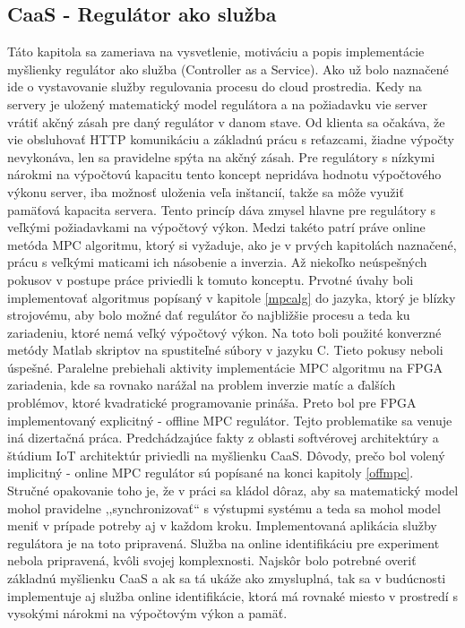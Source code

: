 \subsection{CaaS - Regulátor ako služba} \label{caas}
Táto kapitola sa zameriava na vysvetlenie, motiváciu a popis implementácie myšlienky regulátor ako služba (Controller as a Service). Ako už bolo naznačené ide o vystavovanie služby regulovania procesu do cloud prostredia. Kedy na servery je uložený matematický model regulátora a na požiadavku vie server vrátiť akčný zásah pre daný regulátor v danom stave. Od klienta sa očakáva, že vie obsluhovať HTTP komunikáciu a základnú prácu s reťazcami, žiadne výpočty nevykonáva, len sa pravidelne spýta na akčný zásah. Pre regulátory s nízkymi nárokmi na výpočtovú kapacitu tento koncept nepridáva hodnotu výpočtového výkonu server, iba možnosť uloženia veľa inštancií, takže sa môže využiť pamäťová kapacita servera. Tento princíp dáva zmysel hlavne pre regulátory s veľkými požiadavkami na výpočtový výkon. Medzi takéto patrí práve online metóda MPC algoritmu, ktorý si vyžaduje, ako je v prvých kapitolách naznačené, prácu s veľkými maticami ich násobenie a  inverzia. Až niekoľko neúspešných pokusov v postupe práce priviedli k tomuto konceptu. Prvotné úvahy boli implementovať algoritmus popísaný v kapitole \ref{mpcalg} do jazyka, ktorý je blízky strojovému, aby bolo možné dať regulátor čo najbližšie procesu a teda ku zariadeniu, ktoré nemá veľký výpočtový výkon. Na toto boli použité konverzné metódy Matlab skriptov na spustiteľné súbory v jazyku C. Tieto pokusy neboli úspešné. Paralelne prebiehali aktivity implementácie MPC algoritmu na FPGA zariadenia, kde sa rovnako narážal na problem inverzie matíc a ďalších problémov, ktoré kvadratické programovanie prináša. Preto bol pre FPGA implementovaný explicitný - offline MPC regulátor. Tejto problematike sa venuje iná dizertačná práca. Predchádzajúce fakty z oblasti softvérovej architektúry a štúdium IoT architektúr priviedli na myšlienku CaaS. Dôvody, prečo bol volený implicitný - online MPC regulátor sú popísané na konci kapitoly \ref{offmpc}. Stručné opakovanie toho je, že v práci sa kládol dôraz, aby sa matematický model mohol pravidelne ,,synchronizovať`` s výstupmi systému a teda sa mohol model meniť v prípade potreby aj v každom kroku. Implementovaná aplikácia služby regulátora je na toto pripravená. Služba na online identifikáciu pre experiment nebola pripravená, kvôli svojej komplexnosti. Najskôr bolo potrebné overiť základnú myšlienku CaaS a ak sa tá ukáže ako zmysluplná, tak sa v budúcnosti implementuje aj služba online identifikácie, ktorá má rovnaké miesto v prostredí s vysokými nárokmi na výpočtovým výkon a pamäť.
